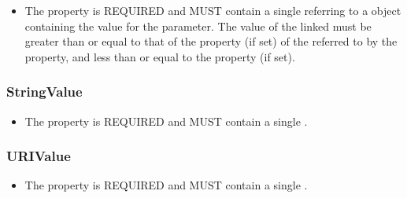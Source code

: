 \begin{itemize}
\item \label{sec:hasValue}
The  property is REQUIRED and MUST contain a single  referring to a  object containing the value for the parameter.
The value of the linked  must be greater than or equal to that of the  property (if set) of the  referred to by the  property, and less than or equal to the  property (if set).
\end{itemize}


\subsubsection{StringValue}
\label{sec:StringValue}

\begin{itemize}
\item \label{sec:SV:value}
The  property is REQUIRED and MUST contain a single .
\end{itemize}


\subsubsection{URIValue}
\label{sec:URIValue}

\begin{itemize}
\item \label{sec:UV:value}
The  property is REQUIRED and MUST contain a single .
\end{itemize}










